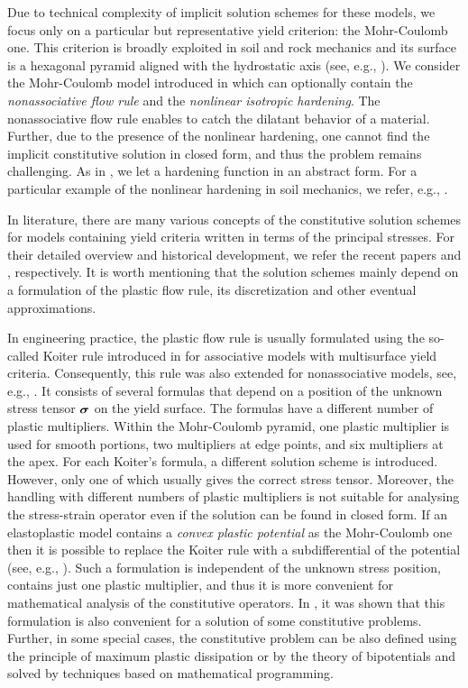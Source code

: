 \documentclass[a4paper,12pt]{article}
\theoremstyle{remark}
\newcommand{\mbf}[1]{\mbox{\boldmath$#1$}}
\numberwithin{equation}{section}
\begin{document}
Due to technical complexity of implicit solution schemes for these models, we focus only on a particular but representative yield criterion: the Mohr-Coulomb one. This criterion is broadly exploited in soil and rock mechanics and its surface is a hexagonal pyramid aligned with the hydrostatic axis (see, e.g., \cite{NPO08}). We consider the Mohr-Coulomb model introduced in \cite[Section 8]{NPO08} which can optionally contain the {\it nonassociative flow rule} and the {\it nonlinear isotropic hardening}. The nonassociative flow rule enables to catch the dilatant behavior of a material. Further, due to the presence of the nonlinear hardening, one cannot find the implicit constitutive solution in closed form, and thus the problem remains challenging. As in \cite{NPO08}, we let a hardening function in an abstract form. For a particular example of the nonlinear hardening in soil mechanics, we refer, e.g., \cite{BSS03}.

In literature, there are many various concepts of the constitutive solution schemes for models containing yield criteria written in terms of the principal stresses. For their detailed overview and historical development, we refer the recent papers \cite{CDA15} and \cite{K13}, respectively. It is worth mentioning that the solution schemes mainly depend on a formulation of the plastic flow rule, its discretization and other eventual approximations.

In engineering practice, the plastic flow rule is usually formulated using the so-called Koiter rule introduced in \cite{K53} for associative models with multisurface yield criteria. Consequently, this rule was also extended for nonassociative models, see, e.g., \cite{dB87}. It consists of several formulas that depend on a position of the unknown stress tensor $\mbf\sigma$ on the yield surface. The formulas have a different number of plastic multipliers. Within the Mohr-Coulomb pyramid, one plastic multiplier is used for smooth portions, two multipliers at edge points, and six multipliers at the apex. For each Koiter's formula, a different solution scheme is introduced. However,  only one of which usually gives the correct stress tensor. Moreover, the handling with different numbers of plastic multipliers is not suitable for analysing the stress-strain operator even if the solution can be found in closed form. If an elastoplastic model contains a {\it convex plastic potential} as the Mohr-Coulomb one then it is possible to replace the Koiter rule with a subdifferential of the potential (see, e.g., \cite{NPO08}). Such a formulation is independent of the unknown stress position, contains just one plastic multiplier, and thus it is more convenient for mathematical analysis of the constitutive operators. In \cite{SCKKZB15}, it was shown that this formulation is also convenient for a solution of some constitutive problems. Further, in some special cases, the constitutive problem can  be also defined using the principle of maximum plastic dissipation \cite{NPO08, HR99} or by the theory of bipotentials \cite{B12} and solved by techniques based on mathematical programming. 
\end{document}
